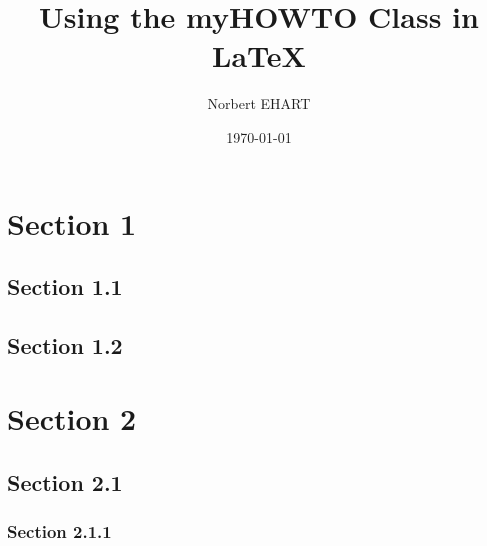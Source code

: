 \documentclass[]{myHOWTO-V1}
\title{Using the myHOWTO Class in \LaTeX}
\author{Norbert EHART}
\date{\today}
\begin{document}
\tableofcontents

\section{Section 1}
\lipsum[9-10]

\subsection{Section 1.1}
\lipsum[4]

\subsection{Section 1.2}
\lipsum[5]

\section{Section 2}
\lipsum[9-10]

\subsection{Section 2.1}
\lipsum[4]

\subsubsection{Section 2.1.1}
\lipsum[5]
\end{document}
